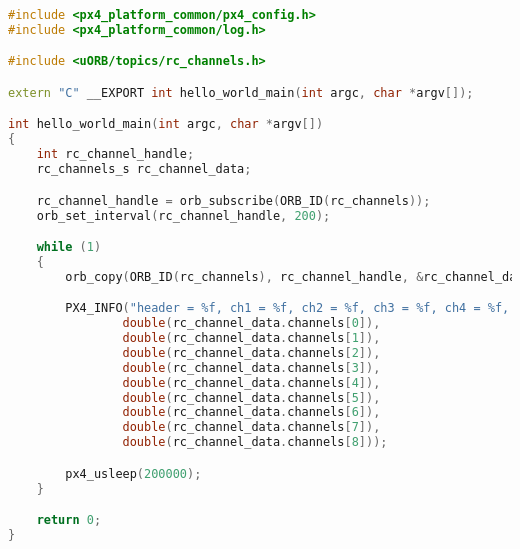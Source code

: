 \begin{lstlisting}[language=c++,caption=Step 0 Code, label=list:step0]
#include <px4_platform_common/px4_config.h>
#include <px4_platform_common/log.h>

#include <uORB/topics/rc_channels.h>

extern "C" __EXPORT int hello_world_main(int argc, char *argv[]);

int hello_world_main(int argc, char *argv[])
{
    int rc_channel_handle;
    rc_channels_s rc_channel_data;

    rc_channel_handle = orb_subscribe(ORB_ID(rc_channels));
    orb_set_interval(rc_channel_handle, 200);

    while (1)
    {
        orb_copy(ORB_ID(rc_channels), rc_channel_handle, &rc_channel_data);

        PX4_INFO("header = %f, ch1 = %f, ch2 = %f, ch3 = %f, ch4 = %f, ch5 = %f, ch6 = %f, ch7 = %f, ch8 = %f",
                double(rc_channel_data.channels[0]),
                double(rc_channel_data.channels[1]),
                double(rc_channel_data.channels[2]),
                double(rc_channel_data.channels[3]),
                double(rc_channel_data.channels[4]),
                double(rc_channel_data.channels[5]),
                double(rc_channel_data.channels[6]),
                double(rc_channel_data.channels[7]),
                double(rc_channel_data.channels[8]));

        px4_usleep(200000);
    }

    return 0;
}
\end{lstlisting}

